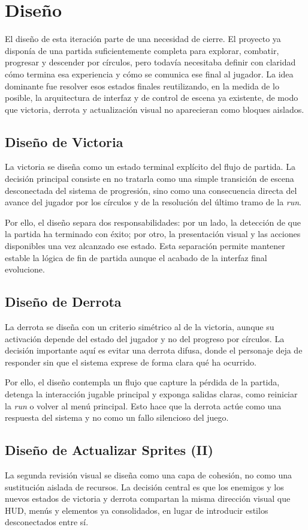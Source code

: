 \section{Diseño}
El diseño de esta iteración parte de una necesidad de cierre. El proyecto ya disponía de una
partida suficientemente completa para explorar, combatir, progresar y descender por círculos,
pero todavía necesitaba definir con claridad cómo termina esa experiencia y cómo se comunica
ese final al jugador. La idea dominante fue resolver esos estados finales reutilizando, en la
medida de lo posible, la arquitectura de interfaz y de control de escena ya existente, de
modo que victoria, derrota y actualización visual no aparecieran como bloques aislados.

\subsection{Diseño de Victoria}
La victoria se diseña como un estado terminal explícito del flujo de partida. La decisión
principal consiste en no tratarla como una simple transición de escena desconectada del
sistema de progresión, sino como una consecuencia directa del avance del jugador por los
círculos y de la resolución del último tramo de la \textit{run}.

Por ello, el diseño separa dos responsabilidades: por un lado, la detección de que la partida
ha terminado con éxito; por otro, la presentación visual y las acciones disponibles una vez
alcanzado ese estado. Esta separación permite mantener estable la lógica de fin de partida
aunque el acabado de la interfaz final evolucione.

\subsection{Diseño de Derrota}
La derrota se diseña con un criterio simétrico al de la victoria, aunque su activación
depende del estado del jugador y no del progreso por círculos. La decisión importante aquí es
evitar una derrota difusa, donde el personaje deja de responder sin que el sistema exprese de
forma clara qué ha ocurrido.

Por ello, el diseño contempla un flujo que capture la pérdida de la partida, detenga la
interacción jugable principal y exponga salidas claras, como reiniciar la \textit{run} o
volver al menú principal. Esto hace que la derrota actúe como una respuesta del sistema y no
como un fallo silencioso del juego.

\subsection{Diseño de Actualizar Sprites (II)}
La segunda revisión visual se diseña como una capa de cohesión, no como una sustitución
aislada de recursos. La decisión central es que los enemigos y los nuevos estados de victoria
y derrota compartan la misma dirección visual que HUD, menús y elementos ya consolidados, en
lugar de introducir estilos desconectados entre sí.

